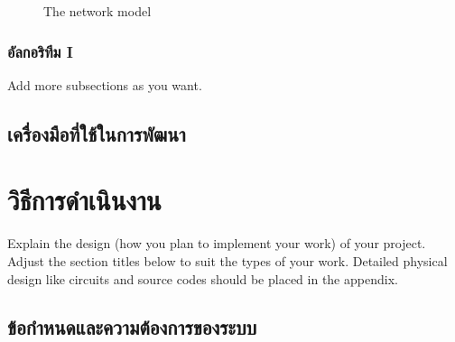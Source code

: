\documentclass[12pt,oneside,openright,a4paper]{explo-thai-project}
\begin{document}
\begin{figure}[!h]\centering
\setlength{\fboxrule}{0.2mm} %
\setlength{\fboxsep}{1cm}
\caption{The network model}\label{fig:model2}
\end{figure}

 
\subsection{อัลกอริทึม I}
Add more subsections as you want.


\section{เครื่องมือที่ใช้ในการพัฒนา}


\chapter{วิธีการดำเนินงาน}

Explain the design (how you plan to implement your work) of your project. Adjust the section titles below to suit the types of your work. Detailed physical design like circuits and source codes should be placed in the appendix.

\section{ข้อกำหนดและความต้องการของระบบ}
\end{document}
